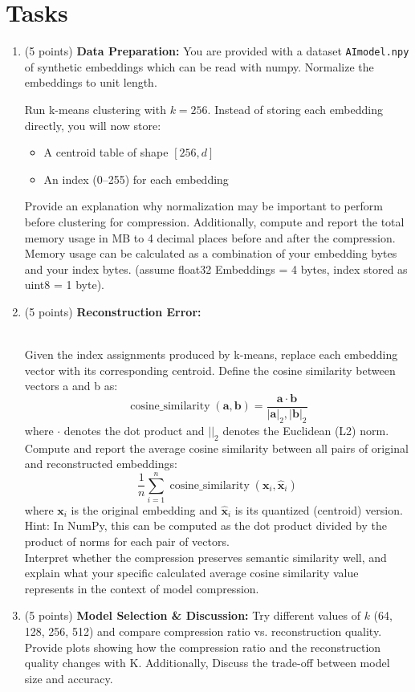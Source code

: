 \documentclass[twoside,10pt]{article}
\begin{document}
\section*{Tasks}
\begin{enumerate}
    \item (5 points) \textbf{Data Preparation:} You are provided with a dataset \texttt{AImodel.npy} of synthetic embeddings which can be read with numpy. Normalize the embeddings to unit length. 

 Run k-means clustering with $k = 256$. Instead of storing each embedding directly, you will now store:
    \begin{itemize}
        \item A centroid table of shape $[256, d]$
        \item An index (0--255) for each embedding
    \end{itemize}
    Provide an explanation why normalization may be important to perform before clustering for compression. Additionally, compute and report the total memory usage in MB to 4 decimal places before and after the compression. Memory usage can be calculated as a combination of your embedding bytes and your index bytes. (assume float32 Embeddings = 4 bytes, index stored as uint8 = 1 byte).

    \item (5 points) \textbf{Reconstruction Error:} 

    \\
    Given the index assignments produced by k-means, replace each embedding vector with its corresponding centroid.
    Define the cosine similarity between vectors a and b as: \\ $$\operatorname{cosine\_similarity}(\mathbf{a}, \mathbf{b}) = \frac{\mathbf{a} \cdot \mathbf{b}}{|\mathbf{a}|_2 , |\mathbf{b}|_2}$$ where $\cdot$ denotes the dot product and $|\mathbf{}|_2$ denotes the Euclidean (L2) norm.
    Compute and report the average cosine similarity between all pairs of original and reconstructed embeddings:$$\frac{1}{n} \sum_{i=1}^{n} \operatorname{cosine\_similarity}(\mathbf{x}_i, \hat{\mathbf{x}}_i)$$
    where $\mathbf{x}_i$ is the original embedding and $\hat{\mathbf{x}}_i$ is its quantized (centroid) version. 
     \\
    Hint: In NumPy, this can be computed as the dot product divided by the product of norms for each pair of vectors.
    \\
    Interpret whether the compression preserves semantic similarity well, and explain what your specific calculated average cosine similarity value represents in the context of model compression.
    

    \item  (5 points) \textbf{Model Selection \& Discussion:} Try different values of $k$ (64, 128, 256, 512) and compare compression ratio vs. reconstruction quality. Provide plots showing how the compression ratio and the reconstruction quality changes with K. Additionally, Discuss the trade-off between model size and accuracy. 
\end{enumerate}
\end{document}
